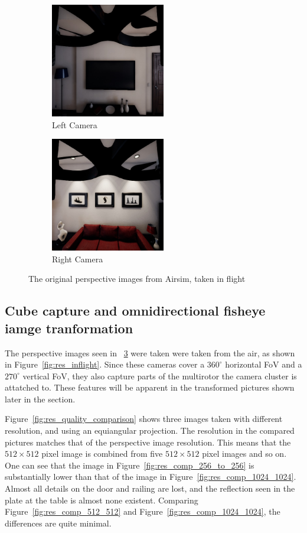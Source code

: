 \begin{figure}[!htb]
\begin{subfigure}{0.32\textwidth}
        \centering
        \includegraphics[height=5cm]{rapport/fig/Results/single/left_center.jpeg}
        \caption{Left Camera}
        \label{fig:res_original_left}
    \end{subfigure}
    \begin{subfigure}{0.32\textwidth}
        \centering
        \includegraphics[height=5cm]{rapport/fig/Results/single/right_center.jpeg}
        \caption{Right Camera}
        \label{fig:res_original_right}
    \end{subfigure}
    \centering
    \caption{The original perspective images from Airsim, taken in flight}
    \label{fig:res_original_pictures}
\end{figure}

\subsection{Cube capture and omnidirectional fisheye iamge tranformation}

The perspective images seen in ~\ref{fig:res_original_pictures} were taken were taken from the air, as shown in Figure~\ref{fig:res_inflight}. Since these cameras cover a $360^\circ$ horizontal FoV and a $270^\circ$ vertical FoV, they also capture parts of the multirotor the camera cluster is attatched to. These features will be apparent in the transformed pictures shown later in the section.

Figure~\ref{fig:res_quality_comparison} shows three images taken with different resolution, and using an equiangular projection. The resolution in the compared pictures matches that of the perspective image resolution. This means that the $512\times512$ pixel image is combined from five $512\times512$ pixel images and so on. One can see that the image in Figure~\ref{fig:res_comp_256_to_256} is substantially lower than that of the image in Figure~\ref{fig:res_comp_1024_1024}. Almost all details on the door and railing are lost, and the reflection seen in the plate at the table is almost none existent. Comparing Figure~\ref{fig:res_comp_512_512} and Figure~\ref{fig:res_comp_1024_1024}, the differences are quite minimal.

